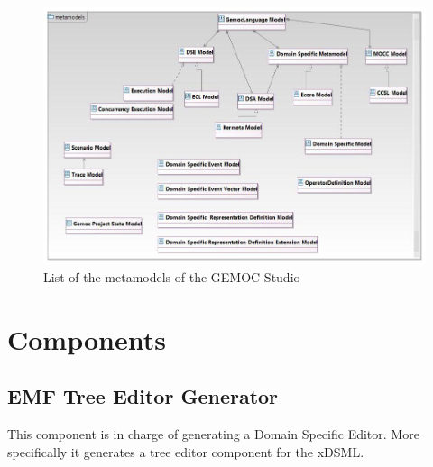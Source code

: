\documentclass{gemoc} %
\begin{document}
\begin{figure}[htp]
	\begin{center}
	\includegraphics*[trim=0.0cm 0.0cm 0cm 0.0cm, clip=true, width=1.0\linewidth]{../images/Gemoc Metamodels Class Diagram.jpg}
	\caption{List of the metamodels of the GEMOC Studio}
	\label{fig:MetamodelList}
	\end{center}
\end{figure}


\section{Components}

\subsection{EMF Tree Editor Generator}
\label{sec:EMF_Tree_Editor_Generator}

This component is in charge of generating a Domain Specific Editor. More specifically it generates a tree editor component for the xDSML. 
\end{document}
